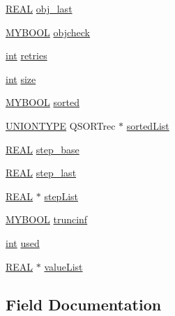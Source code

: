 \begin{DoxyCompactItemize}
\item 
\hyperlink{lp__lib_8h_a92bd5e363d131fa73669358edb232dce}{R\+E\+AL} \hyperlink{struct__multirec_ae2a6387e0e8e5d4b2e4ac55d837ef258}{obj\+\_\+last}
\item 
\hyperlink{lp__lib_8h_aad848328fb3018217ac9f01d97b6bd88}{M\+Y\+B\+O\+OL} \hyperlink{struct__multirec_a905aac80bbab82f4f0e5e6ce174a5896}{objcheck}
\item 
\hyperlink{lp__lib_8h_adeb9ec6400320e4923ac9d836d509ddb}{int} \hyperlink{struct__multirec_a2f6297781e3308811c1f4cac182bb104}{retries}
\item 
\hyperlink{lp__lib_8h_adeb9ec6400320e4923ac9d836d509ddb}{int} \hyperlink{struct__multirec_a8ebb8f0bd8ad5939cde895b1a34fdeec}{size}
\item 
\hyperlink{lp__lib_8h_aad848328fb3018217ac9f01d97b6bd88}{M\+Y\+B\+O\+OL} \hyperlink{struct__multirec_a85f1535d05eea9586b1051738b4257a5}{sorted}
\item 
\hyperlink{lp__types_8h_a564ad5de57db3f857df175094881e422}{U\+N\+I\+O\+N\+T\+Y\+PE} Q\+S\+O\+R\+Trec $\ast$ \hyperlink{struct__multirec_a66abc43a2a22d861123a66c6484c127b}{sorted\+List}
\item 
\hyperlink{lp__lib_8h_a92bd5e363d131fa73669358edb232dce}{R\+E\+AL} \hyperlink{struct__multirec_a5a870cd9ab4a5cbb3c7c78aa0f7cc2fc}{step\+\_\+base}
\item 
\hyperlink{lp__lib_8h_a92bd5e363d131fa73669358edb232dce}{R\+E\+AL} \hyperlink{struct__multirec_ab5af6c862ecd1af2302fd6dc38d64d59}{step\+\_\+last}
\item 
\hyperlink{lp__lib_8h_a92bd5e363d131fa73669358edb232dce}{R\+E\+AL} $\ast$ \hyperlink{struct__multirec_acfab83f282eaf3c22baa36b702b0abe6}{step\+List}
\item 
\hyperlink{lp__lib_8h_aad848328fb3018217ac9f01d97b6bd88}{M\+Y\+B\+O\+OL} \hyperlink{struct__multirec_aedb8b59ccce2e60600b00b62cf064cea}{truncinf}
\item 
\hyperlink{lp__lib_8h_adeb9ec6400320e4923ac9d836d509ddb}{int} \hyperlink{struct__multirec_abbeea1bc98405121d3f00cf0f52b92a5}{used}
\item 
\hyperlink{lp__lib_8h_a92bd5e363d131fa73669358edb232dce}{R\+E\+AL} $\ast$ \hyperlink{struct__multirec_a99ca2dad3defbc66f01d7e59b637eacb}{value\+List}
\end{DoxyCompactItemize}


\subsection{Field Documentation}
\mbox{\label{struct__multirec_ae7517308809be36ead28ef1e0344e6ce}} 
